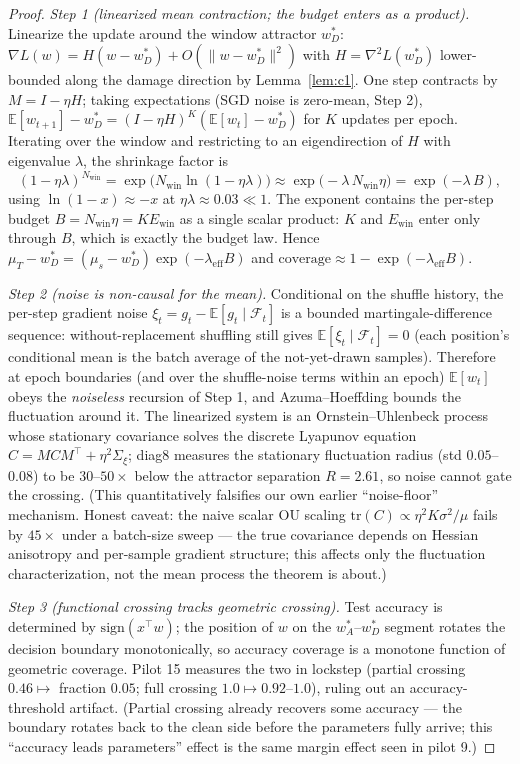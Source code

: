 \documentclass{article}
\newcommand{\Ewin}{E_{\mathrm{win}}}
\newcommand{\B}{B}            %
\newcommand{\lam}{\lambda}
\newcommand{\lameff}{\lam_{\mathrm{eff}}}
\begin{document}
\begin{proof}[Proof]
\emph{Step 1 (linearized mean contraction; the budget enters as a product).} Linearize the
update around the window attractor $w^*_D$: $\nabla L(w)=H(w-w^*_D)+O(\|w-w^*_D\|^2)$ with
$H=\nabla^2L(w^*_D)$ lower-bounded along the damage direction by Lemma~\ref{lem:c1}. One step
contracts by $M=I-\eta H$; taking expectations (SGD noise is zero-mean, Step 2),
$\mathbb{E}[w_{t+1}]-w^*_D=(I-\eta H)^K(\mathbb{E}[w_t]-w^*_D)$ for $K$ updates per epoch.
Iterating over the window and restricting to an eigendirection of $H$ with eigenvalue
$\lambda$, the shrinkage factor is
\begin{equation}
(1-\eta\lambda)^{N_{\mathrm{win}}}
=\exp\!\big(N_{\mathrm{win}}\ln(1-\eta\lambda)\big)
\approx\exp\!\big(-\lambda\,N_{\mathrm{win}}\eta\big)=\exp(-\lambda\,\B),
\end{equation}
using $\ln(1-x)\approx-x$ at $\eta\lambda\approx0.03\ll1$. The exponent contains the per-step
budget $\B=N_{\mathrm{win}}\eta=K\Ewin$ as a single scalar product: $K$ and $\Ewin$ enter only
through $\B$, which is exactly the budget law. Hence
$\mu_T-w^*_D=(\mu_s-w^*_D)\exp(-\lameff\B)$ and
$\mathrm{coverage}\approx1-\exp(-\lameff\B)$.

\emph{Step 2 (noise is non-causal for the mean).} Conditional on the shuffle history, the
per-step gradient noise $\xi_t=g_t-\mathbb{E}[g_t\mid\mathcal F_t]$ is a bounded
martingale-difference sequence: without-replacement shuffling still gives
$\mathbb{E}[\xi_t\mid\mathcal F_t]=0$ (each position's conditional mean is the batch average
of the not-yet-drawn samples). Therefore at epoch boundaries (and over the shuffle-noise
terms within an epoch) $\mathbb{E}[w_t]$ obeys the \emph{noiseless}
recursion of Step 1, and Azuma--Hoeffding bounds the fluctuation around it. The linearized
system is an Ornstein--Uhlenbeck process whose stationary covariance solves the discrete
Lyapunov equation $C=MCM^\top+\eta^2\Sigma_\xi$; diag8 measures the stationary fluctuation
radius (std $0.05$--$0.08$) to be $30$--$50\times$ below the attractor separation $R=2.61$,
so noise cannot gate the crossing. (This quantitatively falsifies our own earlier
``noise-floor'' mechanism. Honest caveat: the naive scalar OU scaling
$\mathrm{tr}(C)\propto\eta^2K\sigma^2/\mu$ fails by $45\times$ under a batch-size sweep ---
the true covariance depends on Hessian anisotropy and per-sample gradient structure; this
affects only the fluctuation characterization, not the mean process the theorem is about.)

\emph{Step 3 (functional crossing tracks geometric crossing).} Test accuracy is determined by
$\mathrm{sign}(x^\top w)$; the position of $w$ on the $w^*_A$--$w^*_D$ segment rotates the
decision boundary monotonically, so accuracy coverage is a monotone function of geometric
coverage. Pilot 15 measures the two in lockstep (partial crossing $0.46\mapsto$ fraction
$0.05$; full crossing $1.0\mapsto0.92$--$1.0$), ruling out an accuracy-threshold artifact.
(Partial crossing already recovers some accuracy --- the boundary rotates back to the clean
side before the parameters fully arrive; this ``accuracy leads parameters'' effect is the
same margin effect seen in pilot 9.)
\end{proof}
\end{document}
